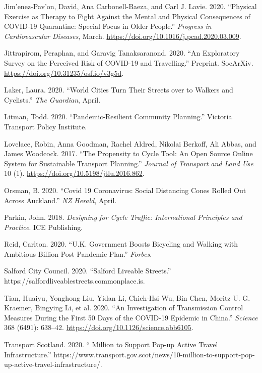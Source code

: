 \documentclass[
]{article}
\newlength{\cslhangindent}
\newenvironment{cslreferences}%
  {\setlength{\parindent}{0pt}%
  \everypar{\setlength{\hangindent}{\cslhangindent}}\ignorespaces}%
  {\par}
\begin{document}
\begin{cslreferences}
\leavevmode\hypertarget{ref-jimenez-pavon_physical_2020}{}%
Jim\a'enez-Pav\a'on, David, Ana Carbonell-Baeza, and Carl J. Lavie. 2020. ``Physical Exercise as Therapy to Fight Against the Mental and Physical Consequences of COVID-19 Quarantine: Special Focus in Older People.'' \emph{Progress in Cardiovascular Diseases}, March. \url{https://doi.org/10.1016/j.pcad.2020.03.009}.

\leavevmode\hypertarget{ref-jittrapirom_exploratory_2020}{}%
Jittrapirom, Peraphan, and Garavig Tanaksaranond. 2020. ``An Exploratory Survey on the Perceived Risk of COVID-19 and Travelling.'' Preprint. SocArXiv. \url{https://doi.org/10.31235/osf.io/v3g5d}.

\leavevmode\hypertarget{ref-laker_world_2020}{}%
Laker, Laura. 2020. ``World Cities Turn Their Streets over to Walkers and Cyclists.'' \emph{The Guardian}, April.

\leavevmode\hypertarget{ref-litman_pandemicresilient_2020}{}%
Litman, Todd. 2020. ``Pandemic-Resilient Community Planning.'' Victoria Transport Policy Institute.

\leavevmode\hypertarget{ref-lovelace_propensity_2017}{}%
Lovelace, Robin, Anna Goodman, Rachel Aldred, Nikolai Berkoff, Ali Abbas, and James Woodcock. 2017. ``The Propensity to Cycle Tool: An Open Source Online System for Sustainable Transport Planning.'' \emph{Journal of Transport and Land Use} 10 (1). \url{https://doi.org/10.5198/jtlu.2016.862}.

\leavevmode\hypertarget{ref-orsman_covid_2020}{}%
Orsman, B. 2020. ``Covid 19 Coronavirus: Social Distancing Cones Rolled Out Across Auckland.'' \emph{NZ Herald}, April.

\leavevmode\hypertarget{ref-parkin_designing_2018}{}%
Parkin, John. 2018. \emph{Designing for Cycle Traffic: International Principles and Practice}. ICE Publishing.

\leavevmode\hypertarget{ref-reid_government_2020}{}%
Reid, Carlton. 2020. ``U.K. Government Boosts Bicycling and Walking with Ambitious Billion Post-Pandemic Plan.'' \emph{Forbes}.

\leavevmode\hypertarget{ref-salfordcitycouncil_salford_2020}{}%
Salford City Council. 2020. ``Salford Liveable Streets.'' https://salfordliveablestreets.commonplace.is.

\leavevmode\hypertarget{ref-tian_investigation_2020}{}%
Tian, Huaiyu, Yonghong Liu, Yidan Li, Chieh-Hsi Wu, Bin Chen, Moritz U. G. Kraemer, Bingying Li, et al. 2020. ``An Investigation of Transmission Control Measures During the First 50 Days of the COVID-19 Epidemic in China.'' \emph{Science} 368 (6491): 638--42. \url{https://doi.org/10.1126/science.abb6105}.

\leavevmode\hypertarget{ref-transportscotland_10_2020}{}%
Transport Scotland. 2020. `` Million to Support Pop-up Active Travel Infrastructure.'' https://www.transport.gov.scot/news/10-million-to-support-pop-up-active-travel-infrastructure/.
\end{cslreferences}
\end{document}
